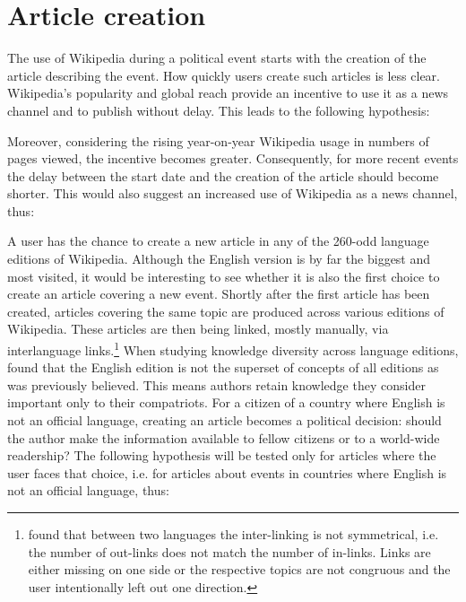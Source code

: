 \section{Article creation}\label{sec:articlecreation}

The use of Wikipedia during a political event starts with the creation of the article describing the event.
How quickly users create such articles is less clear.
Wikipedia's popularity and global reach provide an incentive to use it as a news channel and to publish without delay.
This leads to the following hypothesis:


Moreover, considering the rising year-on-year Wikipedia usage in numbers of pages viewed\cite{wikipv}, the incentive becomes greater.
Consequently, for more recent events the delay between the start date and the creation of the article should become shorter.
This would also suggest an increased use of Wikipedia as a news channel, thus:


A user has the chance to create a new article in any of the 260-odd language editions of Wikipedia.
Although the English version is by far the biggest and most visited, it would be interesting to see whether it is also the first choice to create an article covering a new event.
Shortly after the first article has been created, articles covering the same topic are produced across various editions of Wikipedia.
These articles are then being linked, mostly manually, via interlanguage links.\footnote{\textcite{adar2009information} found that between two languages the inter-linking is not symmetrical, i.e. the number of out-links does not match the number of in-links. Links are either missing on one side or the respective topics are not congruous and the user intentionally left out one direction.}
When studying knowledge diversity across language editions, \textcite{hecht2010tower} found that the English edition is not the superset of concepts of all editions as was previously believed.
This means authors retain knowledge they consider important only to their compatriots.
For a citizen of a country where English is not an official language, creating an article becomes a political decision: should the author make the information available to fellow citizens or to a world-wide readership?
The following hypothesis will be tested only for articles where the user faces that choice, i.e. for articles about events in countries where English is not an official language, thus:

